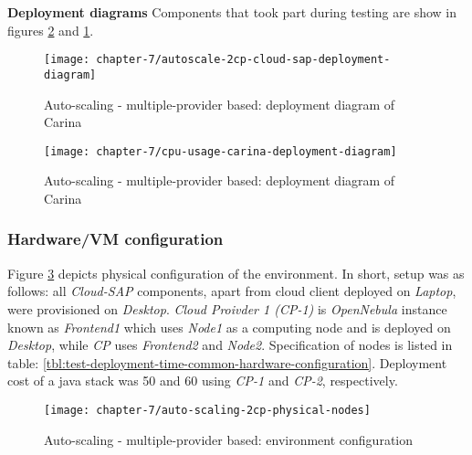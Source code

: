 \begin{asparaenum}
  
  
  \item[\textbf{Deployment diagrams}] Components that took part during testing are show in figures \ref{eval:auto-scaling-2cp-carina-deployment-diagram} and \ref{eval:autoscale-2cp-cloud-sap-deployment-diagram}.

  \begin{figure}[!ht]
    \begin{center}
      \texttt{[image: chapter-7/autoscale-2cp-cloud-sap-deployment-diagram]}
    \end{center}
    \caption{Auto-scaling - multiple-provider based: deployment diagram of Carina}
    \label{eval:autoscale-2cp-cloud-sap-deployment-diagram}
  \end{figure}
  
  \begin{figure}[!ht]
    \begin{center}
      \texttt{[image: chapter-7/cpu-usage-carina-deployment-diagram]}
    \end{center}
    \caption{Auto-scaling - multiple-provider based: deployment diagram of Carina}
    \label{eval:auto-scaling-2cp-carina-deployment-diagram}
  \end{figure}
\end{asparaenum}

\subsubsection*{Hardware/VM configuration}

Figure \ref{eval:auto-scaling-2cp-physical-nodes} depicts physical configuration of the environment. In short, setup was as follows: all \emph{Cloud-SAP} components, apart from cloud client deployed on \emph{Laptop}, were provisioned on \emph{Desktop}. \emph{Cloud Proivder 1 (CP-1)} is \emph{OpenNebula} instance known as \emph{Frontend1} which uses \emph{Node1} as a computing node and is deployed on \emph{Desktop}, while \emph{CP} uses \emph{Frontend2} and \emph{Node2}. Specification of nodes is listed in table: \ref{tbl:test-deployment-time-common-hardware-configuration}. Deployment cost of a java stack was 50 and 60 using \emph{CP-1} and \emph{CP-2}, respectively.

\begin{figure}[!ht]
  \begin{center}
    \texttt{[image: chapter-7/auto-scaling-2cp-physical-nodes]}
  \end{center}
  \caption{Auto-scaling - multiple-provider based: environment configuration}
  \label{eval:auto-scaling-2cp-physical-nodes}
\end{figure}


